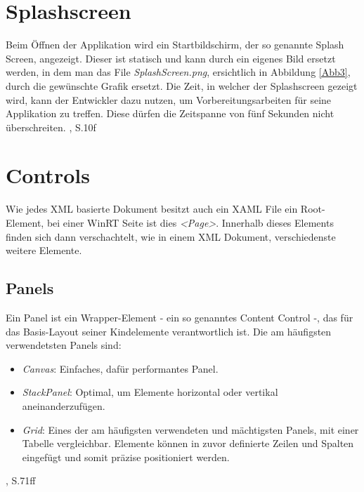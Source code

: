 \documentclass[a4paper,bibtotoc,oneside]{scrbook}
\begin{document}
\section[Splash Screen]{Splashscreen}
Beim Öffnen der Applikation wird ein Startbildschirm, der so genannte Splash Screen, angezeigt. Dieser ist statisch und kann durch ein eigenes Bild ersetzt werden, in dem man das File \textit{SplashScreen.png}, ersichtlich in Abbildung \ref{Abb3}, durch die gewünschte Grafik ersetzt.
\newline
Die Zeit, in welcher der Splashscreen gezeigt wird, kann der Entwickler dazu nutzen, um Vorbereitungsarbeiten für seine Applikation zu treffen. Diese dürfen die Zeitspanne von fünf Sekunden nicht überschreiten.
\cite{ana12}, S.10f

\section[Controls]{Controls}\label{ref:controls}
Wie jedes XML basierte Dokument besitzt auch ein XAML File ein Root-Element, bei einer WinRT Seite ist dies \textit{<Page>}. Innerhalb dieses Elements finden sich dann verschachtelt, wie in einem XML Dokument, verschiedenste weitere Elemente.
\newline
\subsection[Panels]{Panels}\label{ref:panels}
Ein Panel ist ein Wrapper-Element - ein so genanntes Content Control -, das für das Basis-Layout seiner Kindelemente verantwortlich ist.
\newline
Die am häufigsten verwendetsten Panels sind:
\begin{itemize}
\item \textit{Canvas}:
\newline
Einfaches, dafür performantes Panel.
\item \textit{StackPanel}:
\newline
Optimal, um Elemente horizontal oder vertikal aneinanderzufügen.
\item \textit{Grid}:
Eines der am häufigsten verwendeten und mächtigsten Panels, mit einer Tabelle vergleichbar.
\newline
Elemente können in zuvor definierte Zeilen und Spalten eingefügt und somit präzise positioniert werden.
\end{itemize}
\cite{ana12}, S.71ff
\end{document}
